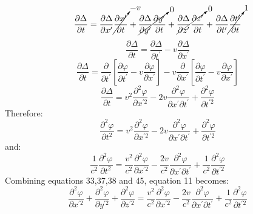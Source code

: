 \documentclass[journal]{IEEEtran}
\begin{document}
\begin{equation}
\frac{\partial\Delta}{\partial t} =
\frac{\partial\Delta}{\partial x^\prime}
\cancelto{-v}{\frac{\partial x^\prime}{\partial t}} +
\cancelto{0}{\frac{\partial\Delta}{\partial y^\prime}
\frac{\partial y^\prime}{\partial t}} +
\cancelto{0}{\frac{\partial\Delta}{\partial z^\prime}
\frac{\partial z^\prime}{\partial t}} +
\frac{\partial\Delta}{\partial t^\prime}
\cancelto{1}{\frac{\partial t^\prime}{\partial t}}
\end{equation}
\begin{equation}
\frac{\partial\Delta}{\partial t} =
\frac{\partial\Delta}{\partial t^\prime}
- v \frac{\partial\Delta}{\partial x^\prime}
\end{equation}
\begin{equation}
\frac{\partial\Delta}{\partial t} = 
\frac{\partial}{\partial t^\prime}
\left[\frac{\partial\varphi}{\partial t^\prime} -
v\frac{\partial\varphi}{\partial x^\prime}\right] - v
\frac{\partial}{\partial x^\prime}
\left[\frac{\partial\varphi}{\partial t^\prime} -
v\frac{\partial\varphi}{\partial x^\prime}\right]
\end{equation}
\begin{equation}
\frac{\partial\Delta}{\partial t} = 
v^2\frac{\partial^2\varphi}{\partial x^{\prime2}} - 2v
\frac{\partial^2\varphi}{\partial x^\prime\partial t^\prime} +
\frac{\partial^2\varphi}{\partial t^{\prime2}}
\end{equation}
Therefore:
\begin{equation}
\frac{\partial^2\varphi}{\partial t^2} =
v^2\frac{\partial^2\varphi}{\partial x^{\prime2}} - 2v
\frac{\partial^2\varphi}{\partial x^\prime\partial t^\prime} +
\frac{\partial^2\varphi}{\partial t^{\prime2}}
\end{equation}
and:
\begin{equation}
\boxed{
\frac{1}{c^2}\frac{\partial^2\varphi}{\partial t^2} =
\frac{v^2}{c^2}\frac{\partial^2\varphi}{\partial x^{\prime2}} -
\frac{2v}{c^2}
\frac{\partial^2\varphi}{\partial x^\prime\partial t^\prime} +
\frac{1}{c^2}\frac{\partial^2\varphi}{\partial t^{\prime2}}
}
\end{equation}
Combining equations 33,37,38 and 45, equation 11 becomes:
\begin{equation}
\boxed{
\frac{\partial^2\varphi}{\partial x^{\prime2}} +
\frac{\partial^2\varphi}{\partial y^{\prime2}} +
\frac{\partial^2\varphi}{\partial z^{\prime2}} =
\frac{v^2}{c^2}\frac{\partial^2\varphi}{\partial x^{\prime2}} -
\frac{2v}{c^2}
\frac{\partial^2\varphi}{\partial x^\prime\partial t^\prime} +
\frac{1}{c^2}\frac{\partial^2\varphi}{\partial t^{\prime2}}
}
\end{equation}
\end{document}
